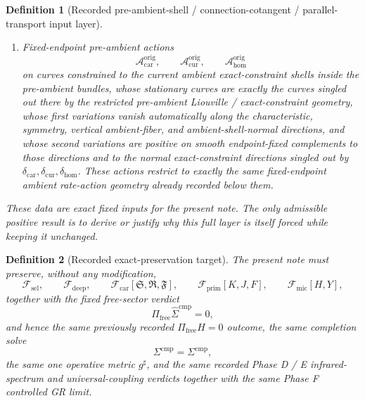 \documentclass[11pt]{article}
\newcommand{\CompletedMetric}{g^{\sharp}}
\newcommand{\CompShift}{\Sigma^{\mathrm{cmp}}}
\newcommand{\CompLift}{\widehat\Sigma^{\mathrm{cmp}}}
\newcommand{\FreeProj}{\Pi_{\mathrm{free}}}
\newcommand{\GaugeAux}{Y}
\newcommand{\MicFunctional}{\mathscr F_{\mathrm{mic}}}
\newcommand{\PrimFunctional}{\mathscr F_{\mathrm{prim}}}
\newcommand{\CarrierFunctional}{\mathscr F_{\mathrm{car}}}
\newcommand{\DeepFunctional}{\mathscr F_{\mathrm{deep}}}
\newcommand{\StemFunctional}{\mathscr F_{\mathrm{sel}}}
\newcommand{\PrimStrain}{K}
\newcommand{\PrimNeutral}{J}
\newcommand{\PrimFree}{F}
\newcommand{\CarrierSeed}{\mathfrak S}
\newcommand{\RelabelSeed}{\mathfrak R}
\newcommand{\FreeSeed}{\mathfrak F}
\newcommand{\TensorConstraintGap}{\delta_{\mathrm{car}}}
\newcommand{\CurConstraintGap}{\delta_{\mathrm{cur}}}
\newcommand{\HomConstraintGap}{\delta_{\mathrm{hom}}}
\newcommand{\HomOriginDensitySource}{\boldsymbol{q}_{\mathrm{hom}}^{\mathrm{orig}}}
\newcommand{\TensorOriginFluxSource}{\boldsymbol{j}_{\mathrm{car}}^{\mathrm{orig}}}
\newcommand{\CurOriginFluxSource}{\boldsymbol{j}_{\mathrm{cur}}^{\mathrm{orig}}}
\newcommand{\HomOriginFluxSource}{\boldsymbol{j}_{\mathrm{hom}}^{\mathrm{orig}}}
\newcommand{\TensorOriginBoundarySource}{\boldsymbol{\rho}_{\mathrm{car}}^{\partial,\mathrm{orig}}}
\newcommand{\CurOriginBoundarySource}{\boldsymbol{\rho}_{\mathrm{cur}}^{\partial,\mathrm{orig}}}
\newcommand{\HomOriginBoundarySource}{\boldsymbol{\rho}_{\mathrm{hom}}^{\partial,\mathrm{orig}}}
\newcommand{\TensorOriginAction}{\mathscr A_{\mathrm{car}}^{\mathrm{orig}}}
\newcommand{\CurOriginAction}{\mathscr A_{\mathrm{cur}}^{\mathrm{orig}}}
\newcommand{\HomOriginAction}{\mathscr A_{\mathrm{hom}}^{\mathrm{orig}}}
\newtheorem{definition}{Definition}
\begin{document}
\begin{definition}[Recorded pre-ambient-shell / connection-cotangent / parallel-transport input layer]
\begin{enumerate}
\[    \HomOriginDensitySource,\qquad
    \TensorOriginFluxSource,\qquad
    \CurOriginFluxSource,\qquad
    \HomOriginFluxSource,
    \]
    and pre-ambient boundary potentials
    \[
    \TensorOriginBoundarySource,\qquad
    \CurOriginBoundarySource,\qquad
    \HomOriginBoundarySource.
    \]
    Their ambient restrictions are exactly the recorded ambient-basic shadow / rate / density / flux / boundary data.
    \item Fixed-endpoint pre-ambient actions
    \[
    \TensorOriginAction,\qquad
    \CurOriginAction,\qquad
    \HomOriginAction
    \]
    on curves constrained to the current ambient exact-constraint shells inside the pre-ambient bundles, whose stationary curves are exactly the curves singled out there by the restricted pre-ambient Liouville / exact-constraint geometry, whose first variations vanish automatically along the characteristic, symmetry, vertical ambient-fiber, and ambient-shell-normal directions, and whose second variations are positive on smooth endpoint-fixed complements to those directions and to the normal exact-constraint directions singled out by \(\TensorConstraintGap,\CurConstraintGap,\HomConstraintGap\). These actions restrict to exactly the same fixed-endpoint ambient rate-action geometry already recorded below them.
\end{enumerate}
These data are exact fixed inputs for the present note. The only admissible positive result is to derive or justify why this full layer is itself forced while keeping it unchanged.
\end{definition}

\begin{definition}[Recorded exact-preservation target]
\label{def:recorded_target}
The present note must preserve, without any modification,
\begin{equation}
\StemFunctional,
\qquad
\DeepFunctional,
\qquad
\CarrierFunctional[\CarrierSeed,\RelabelSeed,\FreeSeed],
\qquad
\PrimFunctional[\PrimStrain,\PrimNeutral,\PrimFree],
\qquad
\MicFunctional[H,\GaugeAux],
\label{eq:target_functionals}
\end{equation}
together with the fixed free-sector verdict
\begin{equation}
\FreeProj\CompLift=0,
\label{eq:target_free}
\end{equation}
and hence the same previously recorded \(\Pi_{\mathrm{free}}H=0\) outcome, the same completion solve
\begin{equation}
\CompShift=\Sigma^{\mathrm{cmp}},
\label{eq:target_sigma}
\end{equation}
the same one operative metric \(\CompletedMetric\), and the same recorded Phase D / E infrared-spectrum and universal-coupling verdicts together with the same Phase F controlled GR limit.
\end{definition}
\end{document}

